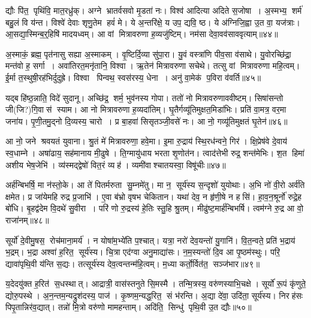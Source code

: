द्यौः पि॑त॒ पृथि॑वि॒ मात॒रध्रु॑क्।
अग्ने भ्रातर्वसवो मृ॒डता॑ नः।
विश्व॑ आदित्या अदिते स॒जोषा।
अ॒स्मभ्य॒ शर्म॑ बहु॒लं वि य॑न्त।
विश्वे॑ देवाः शृणु॒तेम हवं॑ मे।
ये अ॒न्तरि॑क्षे॒ य उप॒ द्यवि॒ ष्ठ।
ये अ॑ग्निजि॒ह्वा उ॒त वा॒ यज॑त्राः।
आ॒सद्या॒स्मिन्ब॒र्॒हिषि॑ मादयध्वम्।
आ वां मित्रावरुणा ह॒व्यजु॑ष्टिम्।
नम॑सा देवा॒वव॑साववृत्याम्॥४४॥

अ॒स्माकं॒ ब्रह्म॒ पृत॑नासु सह्या अ॒स्माकम्।
वृ॒ष्टिर्दि॒व्या सु॑पा॒रा।
यु॒वं वस्त्रा॑णि पीव॒सा व॑साथे।
यु॒वोरच्छि॑द्रा॒ मन्त॑वो ह॒ सर्गा।
अवा॑तिरत॒मनृ॑तानि॒ विश्वा।
ऋ॒तेन॑ मित्रावरुणा सचेथे।
तत्सु वां मित्रावरुणा महि॒त्वम्।
ई॒र्मा त॒स्थुषी॒रह॑भिर्दुदुह्रे।
विश्वा पिन्वथ॒ स्वस॑रस्य॒ धेना।
अनु॑ वा॒मेक॑ प॒विरा व॑वर्ति॥४५॥

यद्बहि॑ष्ठ॒न्नाति॒ विदे॑ सुदानू।
अच्छि॑द्र॒ शर्म॒ भुव॑नस्य गोपा।
ततो॑ नो मित्रावरुणाववीष्टम्।
सिषा॑सन्तो जी(जि?)गि॒वास॑ स्याम।
आ नो मित्रावरुणा ह॒व्यदा॑तिम्।
घृ॒तैर्गव्यू॑तिमुक्षत॒मिडा॑भिः।
प्रति॑ वा॒मत्र॒ वर॒मा जना॑य।
पृ॒णी॒तमु॒द्नो दि॒व्यस्य॒ चारो।
प्र बा॒हवा॑ सिसृतञ्जी॒वसे॑ नः।
आ नो॒ गव्यू॑तिमुक्षतं घृ॒तेन॑॥४६॥

आ नो॒ जने श्रवयतं युवाना।
श्रु॒तं मे॑ मित्रावरुणा॒ हवे॒मा।
इ॒मा रु॒द्राय॑ स्थि॒रध॑न्वने॒ गिर॑।
क्षि॒प्रेष॑वे दे॒वाय॑ स्व॒धाम्ने।
अषा॑ढाय॒ सह॑मानाय मी॒ढुषे।
ति॒ग्मायु॑धाय भरता शृ॒णोत॑न।
त्वाद॑त्तेभी रुद्र॒ शन्त॑मेभिः।
श॒त हिमा॑ अशीय भेष॒जेभि॑।
व्य॑स्मद्द्वेषो॑ वित॒रं व्यह॑।
व्यमी॑वाश्चातयस्वा॒ विषू॑चीः॥४७॥

अर्\mbox{}ह॑न्बिभर्\mbox{}षि॒ मा न॑स्तो॒के।
आ ते॑ पितर्मरुता सु॒म्नमे॑तु।
मा न॒ सूर्य॑स्य स॒न्दृशो॑ युयोथाः।
अ॒भि नो॑ वी॒रो अर्व॑ति क्षमेत।
प्र जा॑येमहि रुद्र प्र॒जाभि॑।
ए॒वा ब॑भ्रो वृषभ चेकितान।
यथा॑ देव॒ न हृ॑णी॒षे न हसि॑।
हा॒व॒न॒श्रूर्नो॑ रुद्रे॒ह बो॑धि।
बृ॒हद्व॑देम वि॒दथे॑ सु॒वीरा।
परि॑ णो रु॒द्रस्य॑ हे॒तिः स्तु॒हि श्रु॒तम्।
मीढु॑ष्ट॒मार्\mbox{}ह॑न्बिभर्\mbox{}षि।
त्वम॑ग्ने रु॒द्र आ वो॒ राजा॑नम्॥४८॥\anuvakamend[वसू॑नि ततानास्तु॒ विश्वान्॑ ववृत्यां ववर्ति घृ॒तेन॒ विषू॑चीः श्रु॒तन्द्वे च॑]

सूर्यो॑ दे॒वीमु॒षस॒ रोच॑माना॒मर्य॑।
न योषा॑म॒भ्ये॑ति प॒श्चात्।
यत्रा॒ नरो॑ देव॒यन्तो॑ यु॒गानि॑।
वि॒त॒न्वते॒ प्रति॑ भ॒द्राय॑ भ॒द्रम्।
भ॒द्रा अश्वा॑ ह॒रित॒ सूर्य॑स्य।
चि॒त्रा एद॑ग्वा अनु॒माद्या॑सः।
न॒म॒स्यन्तो॑ दि॒व आ पृ॒ष्ठम॑स्थुः।
परि॒ द्यावा॑पृथि॒वी य॑न्ति स॒द्यः।
तत्सूर्य॑स्य देव॒त्वन्तन्म॑हि॒त्वम्।
म॒ध्या कर्तो॒र्वित॑त॒ सञ्ज॑भार॥४९॥

य॒देदयु॑क्त ह॒रित॑ स॒धस्थात्।
आद्रात्री॒ वास॑स्तनुते सि॒मस्मै।
तन्मि॒त्रस्य॒ वरु॑णस्याभि॒चक्षे।
सूर्यो॑ रू॒पं कृ॑णुते॒ द्योरु॒पस्थे।
अ॒न॒न्तम॒न्यद्रुश॑दस्य॒ पाज॑।
कृ॒ष्णम॒न्यद्ध॒रित॒ सं भ॑रन्ति।
अ॒द्या दे॑वा॒ उदि॑ता॒ सूर्य॑स्य।
निरह॑सः पिपृ॒तान्निर॑व॒द्यात्।
तन्नो॑ मि॒त्रो वरु॑णो मामहन्ताम्।
अदि॑ति॒ सिन्धु॑ पृथि॒वी उ॒त द्यौः॥५०॥

